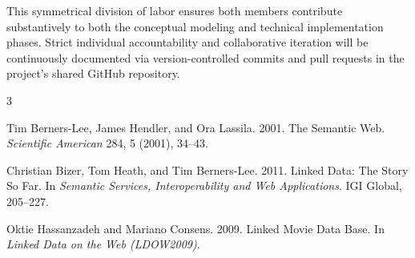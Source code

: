 \documentclass[sigconf]{acmart}
\begin{document}
This symmetrical division of labor ensures both members contribute substantively to both the conceptual modeling and technical implementation phases. Strict individual accountability and collaborative iteration will be continuously documented via version-controlled commits and pull requests in the project's shared GitHub repository.


\begin{thebibliography}{3}

Tim Berners-Lee, James Hendler, and Ora Lassila. 2001.
\newblock The Semantic Web.
\newblock \emph{Scientific American} 284, 5 (2001), 34--43.

Christian Bizer, Tom Heath, and Tim Berners-Lee. 2011.
\newblock Linked Data: The Story So Far.
\newblock In \emph{Semantic Services, Interoperability and Web Applications}. IGI Global, 205--227.

Oktie Hassanzadeh and Mariano Consens. 2009.
\newblock Linked Movie Data Base.
\newblock In \emph{Linked Data on the Web (LDOW2009)}.

\end{thebibliography}
\end{document}
